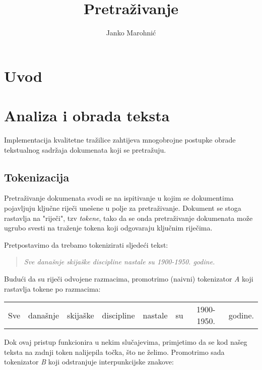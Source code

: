 \documentclass[11pt]{scrreprt}
\title{Pretraživanje}
\author{Janko Marohnić}
\begin{document}
\maketitle


\tableofcontents

\pagebreak


\chapter{Uvod}

\chapter{Analiza i obrada teksta}
\label{ch:processing}

Implementacija kvalitetne tražilice zahtijeva mnogobrojne postupke obrade tekstualnog sadržaja dokumenata koji se pretražuju.

\section{Tokenizacija}

Pretraživanje dokumenata svodi se na ispitivanje u kojim se dokumentima pojavljuju ključne riječi unešene u polje za pretraživanje. Dokument se stoga rastavlja na "riječi", tzv \textit{tokene}, tako da se onda pretraživanje dokumenata može ugrubo svesti na traženje tokena koji odgovaraju ključnim riječima.

Pretpostavimo da trebamo tokenizirati sljedeći tekst:

\begin{quote}
  \textit{Sve današnje skijaške discipline nastale su 1900-1950. godine.}
\end{quote}

Budući da su riječi odvojene razmacima, promotrimo (naivni) tokenizator \textit{A} koji rastavlja tokene po razmacima:

\begin{center}
  \begin{tabular}{cccccccc}
    Sve & današnje & skijaške & discipline & nastale & su & 1900-1950. & godine.
  \end{tabular}
\end{center}

Dok ovaj pristup funkcionira u nekim slučajevima, primjetimo da se kod našeg teksta na zadnji token nalijepila točka, što ne želimo. Promotrimo sada tokenizator \textit{B} koji odstranjuje interpunkcijske znakove:
\end{document}
